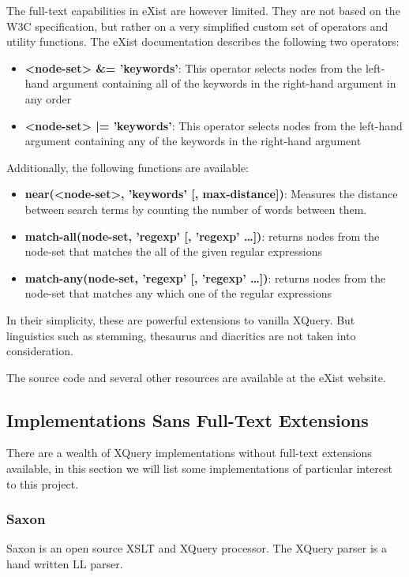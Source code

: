 The full-text capabilities in eXist are however limited. They are not based on
the W3C specification, but rather on a very simplified custom set of operators
and utility functions. The eXist documentation\cite{exist_doc} describes the
following two operators:

\begin{itemize}
  \item \textbf{<node-set> \&= 'keywords'}: This operator selects nodes from the
  left-hand argument containing all of the keywords in the right-hand argument 
  in any order
  \item \textbf{<node-set> |= 'keywords'}: This operator selects nodes from the
  left-hand argument containing any of the keywords in the right-hand argument
\end{itemize}

Additionally, the following functions are available:
\begin{itemize}
  \item \textbf{near(<node-set>, 'keywords' [, max-distance])}: Measures the 
  distance between search terms by counting the number of words between 
  them.
  \item \textbf{match-all(node-set, 'regexp' [, 'regexp' \ldots])}: returns
  nodes from the node-set that matches the all of the given regular expressions 
  \item \textbf{match-any(node-set, 'regexp' [, 'regexp' \ldots])}: returns nodes
  from the node-set that matches any which one of the regular expressions
\end{itemize}

In their simplicity, these are powerful extensions to vanilla XQuery. But
linguistics such as stemming, thesaurus and diacritics are not taken into
consideration.

The source code and several other resources are available at the eXist
website\cite{existweb}. 

\subsection{Implementations Sans Full-Text Extensions}
There are a wealth of XQuery implementations without full-text
extensions available, in this section we will list some implementations of
particular interest to this project.

\subsubsection{Saxon}
Saxon is an open source XSLT and XQuery processor. The XQuery parser is a hand
written LL parser.

